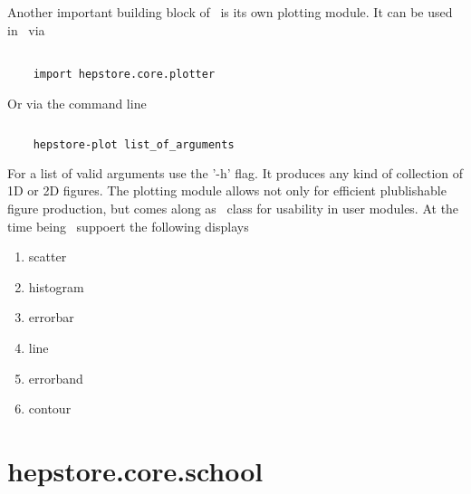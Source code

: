 Another important building block of \hepstore~is its own plotting
module. It can be used in \python~via
%
\begin{changemargin}{1.5cm}{1.5cm}
  \centering
  \begin{lstlisting}
    
    import hepstore.core.plotter
  \end{lstlisting}
\end{changemargin}
%
Or via the command line
%
\begin{changemargin}{1.5cm}{1.5cm}
  \centering
  \begin{lstlisting}[language=Bash]
    
    hepstore-plot list_of_arguments
  \end{lstlisting}
\end{changemargin}
%
For a list of valid arguments use the '-h' flag. It produces any kind
of collection of 1D or 2D figures. The plotting module allows not only
for efficient plublishable figure production, but comes along
as \python~class for usability in user modules.  At the time
being \hepstore~suppoert the following displays
%
\begin{enumerate}
\item scatter
\item histogram
\item errorbar
\item line
\item errorband
\item contour
\end{enumerate}
%


\section{hepstore.core.school}

